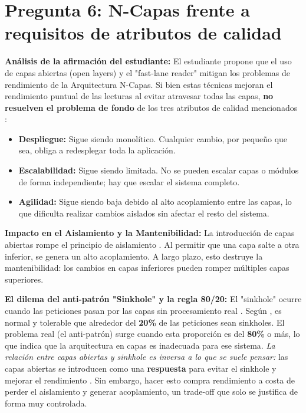 \section{Pregunta 6: N-Capas frente a requisitos de atributos de calidad}


\textbf{Análisis de la afirmación del estudiante:} El estudiante propone que el uso de capas abiertas (open layers) y el "fast-lane reader" mitigan los problemas de rendimiento de la Arquitectura N-Capas. Si bien estas técnicas mejoran el rendimiento puntual de las lecturas al evitar atravesar todas las capas, \textbf{no resuelven el problema de fondo} de los tres atributos de calidad mencionados \parencite{richards2015, richardsford2020}:
\begin{itemize}
    \item \textbf{Despliegue:} Sigue siendo monolítico. Cualquier cambio, por pequeño que sea, obliga a redesplegar toda la aplicación.
    \item \textbf{Escalabilidad:} Sigue siendo limitada. No se pueden escalar capas o módulos de forma independiente; hay que escalar el sistema completo.
    \item \textbf{Agilidad:} Sigue siendo baja debido al alto acoplamiento entre las capas, lo que dificulta realizar cambios aislados sin afectar el resto del sistema.
\end{itemize}

\textbf{Impacto en el Aislamiento y la Mantenibilidad:} La introducción de capas abiertas rompe el principio de aislamiento \parencite{richards2015}. Al permitir que una capa salte a otra inferior, se genera un alto acoplamiento. A largo plazo, esto destruye la mantenibilidad: los cambios en capas inferiores pueden romper múltiples capas superiores.

\textbf{El dilema del anti-patrón "Sinkhole" y la regla 80/20:} El "sinkhole" ocurre cuando las peticiones pasan por las capas sin procesamiento real \parencite{richards2015}. Según \textcite{richards2015}, es normal y tolerable que alrededor del \textbf{20\%} de las peticiones sean sinkholes. El problema real (el anti-patrón) surge cuando esta proporción es del \textbf{80\%} o más, lo que indica que la arquitectura en capas es inadecuada para ese sistema. \textit{La relación entre capas abiertas y sinkhole es inversa a lo que se suele pensar:} las capas abiertas se introducen como una \textbf{respuesta} para evitar el sinkhole y mejorar el rendimiento \parencite{richards2015}. Sin embargo, hacer esto compra rendimiento a costa de perder el aislamiento y generar acoplamiento, un trade-off que solo se justifica de forma muy controlada.


